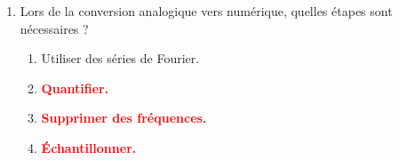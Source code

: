 \documentclass[a4paper]{article}
\begin{document}
\begin{enumerate}[label=Q\arabic*.]
\item Lors de la conversion analogique vers numérique, quelles étapes sont nécessaires ?
\begin{enumerate}
    \item Utiliser des séries de Fourier.
    \item \textcolor{red}{\textbf{Quantifier.}}
    \item \textcolor{red}{\textbf{Supprimer des fréquences.}}
    \item \textcolor{red}{\textbf{Échantillonner.}}
\end{enumerate}


\end{enumerate}



















\end{document}
